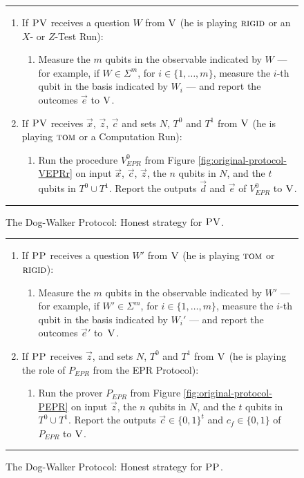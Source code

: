 \begin{figure}[H]
\rule[1ex]{\textwidth}{0.5pt}
\vspace{-20pt}
\begin{enumerate}
  \item If $\textsc{PV}$ receives a question ${W}$ from $\textsc{V}$ (he is playing $\textsc{rigid}$ or an $X$- or $Z$-Test Run):
\begin{enumerate}
     \item[]  Measure the $m$ qubits in the observable indicated by $W$ --- for example, if $W\in \Sigma^m$, for $i\in \{1,\ldots,m\}$, measure the $i$-th qubit in the basis indicated by $W_i$ --- and report the outcomes $\vec{e}$ to $\textsc{V}$.
\end{enumerate}

  \item If $\textsc{PV}$ receives $\vec{x}$, $\vec{z}$, $\vec{c}$ and sets $N$, $T^0$ and $T^1$ from $\textsc{V}$ (he is playing $\textsc{tom}$ or a Computation Run):
\begin{enumerate}
	\item[] Run the procedure $V_{EPR}^0$ from Figure \ref{fig:original-protocol-VEPRr} on input $\vec{x}$, $\vec{c}$, $\vec{z}$, the $n$ qubits in $N$, and the $t$ qubits in $T^0\cup T^1$. Report the outputs  $\vec{d}$ and $\vec{e}$ of $V_{EPR}^0$ to $\textsc{V}$.
\end{enumerate}
\end{enumerate}
\rule[2ex]{\textwidth}{0.5pt}\vspace{-.5cm}
\caption{The Dog-Walker Protocol: Honest strategy for $\textsc{PV}$.}\label{fig:dogwalker-protocol-PV}
\end{figure}

\begin{figure}[H]
\rule[1ex]{\textwidth}{0.5pt}
\vspace{-20pt}
\begin{enumerate}
  \item If $\textsc{PP}$ receives a question ${W}'$ from $\textsc{V}$ (he is playing $\textsc{tom}$ or $\textsc{rigid}$):
\begin{enumerate}
     \item[]  Measure the $m$ qubits in the observable indicated by $W'$ --- for example, if $W'\in\Sigma^m$, for $i\in \{1,\ldots,m\}$, measure the $i$-th qubit in the basis indicated by $W_i'$ --- and report
       the outcomes $\vec{e}'$ to~$\textsc{V}$.
\end{enumerate}
\item If $\textsc{PP}$ receives $\vec{z}$, and sets $N$, $T^0$ and $T^1$ from $\textsc{V}$ (he is playing the role of $P_{EPR}$ from the EPR Protocol):
\begin{enumerate}
     \item[] Run the prover $P_{EPR}$ from Figure \ref{fig:original-protocol-PEPR} on input $\vec{z}$, the $n$ qubits in $N$, and the $t$ qubits in $T^0\cup T^1$.
     Report the outputs $\vec{c}\in\{0,1\}^t$ and $c_f\in\{0,1\}$ of $P_{EPR}$  to $\textsc{V}$. 
\end{enumerate}
\end{enumerate}
\rule[2ex]{\textwidth}{0.5pt}\vspace{-.5cm}
\caption{The Dog-Walker Protocol: Honest strategy for $\textsc{PP}$.}\label{fig:dogwalker-protocol-PP}
\end{figure}


